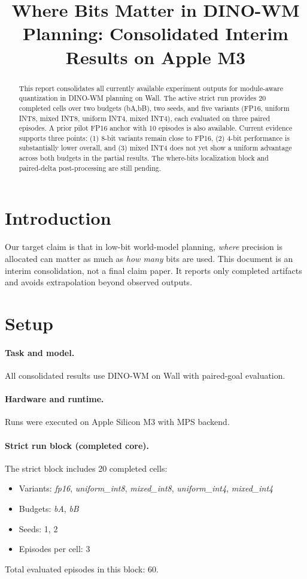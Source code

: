 \documentclass{article}
\title{Where Bits Matter in DINO-WM Planning: Consolidated Interim Results on Apple M3}
\author{}
\begin{document}
\maketitle
{}

\begin{abstract}
This report consolidates all currently available experiment outputs for module-aware quantization in DINO-WM planning on Wall.
The active strict run provides 20 completed cells over two budgets (bA,bB), two seeds, and five variants (FP16, uniform INT8, mixed INT8, uniform INT4, mixed INT4), each evaluated on three paired episodes.
A prior pilot FP16 anchor with 10 episodes is also available.
Current evidence supports three points: (1) 8-bit variants remain close to FP16, (2) 4-bit performance is substantially lower overall, and (3) mixed INT4 does not yet show a uniform advantage across both budgets in the partial results.
The where-bits localization block and paired-delta post-processing are still pending.
\end{abstract}

\section{Introduction}
Our target claim is that in low-bit world-model planning, \emph{where} precision is allocated can matter as much as \emph{how many} bits are used.
This document is an interim consolidation, not a final claim paper.
It reports only completed artifacts and avoids extrapolation beyond observed outputs.

\section{Setup}
\paragraph{Task and model.}
All consolidated results use DINO-WM on Wall with paired-goal evaluation.

\paragraph{Hardware and runtime.}
Runs were executed on Apple Silicon M3 with MPS backend.

\paragraph{Strict run block (completed core).}
The strict block includes 20 completed cells:
\begin{itemize}
  \item Variants: \textit{fp16}, \textit{uniform\_int8}, \textit{mixed\_int8}, \textit{uniform\_int4}, \textit{mixed\_int4}
  \item Budgets: \textit{bA}, \textit{bB}
  \item Seeds: 1, 2
  \item Episodes per cell: 3
\end{itemize}
Total evaluated episodes in this block: 60.
\end{document}

